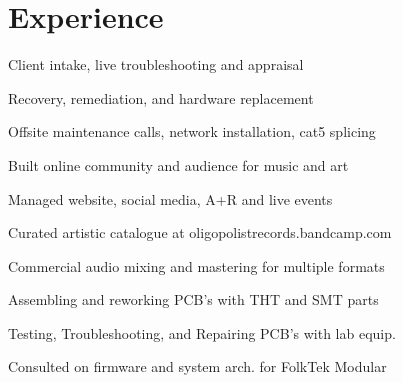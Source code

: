 \documentclass[]{quinnJarvisHollandLatex}
\begin{document}
%
%
%
%
\begin{minipage}[t]{0.60\textwidth}
\section{Experience}
\vspace{\topsep} %
\begin{tightemize}
\item Client intake, live troubleshooting and appraisal
\item Recovery, remediation, and hardware replacement
\item Offsite maintenance calls, network installation, cat5 splicing
\end{tightemize}


\begin{tightemize}
\item{Built online community and audience for music and art}
\item{Managed website, social media, A+R and live events}
\item{Curated artistic catalogue at oligopolistrecords.bandcamp.com}
\end{tightemize}

\begin{tightemize}
\item Commercial audio mixing and mastering for multiple formats
\item Assembling and reworking PCB's with THT and SMT parts
\item Testing, Troubleshooting, and Repairing PCB's with lab equip.
\item Consulted on firmware and system arch. for FolkTek Modular
\end{tightemize}


\end{minipage}
\end{document}
